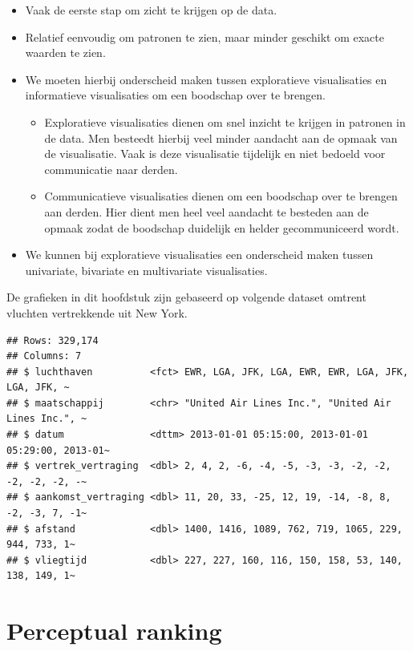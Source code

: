 \documentclass[]{tufte-book}
\providecommand{\tightlist}{%
  \setlength{\itemsep}{0pt}\setlength{\parskip}{0pt}}
\begin{document}
\begin{itemize}
\tightlist
\item
  Vaak de eerste stap om zicht te krijgen op de data.
\item
  Relatief eenvoudig om patronen te zien, maar minder geschikt om exacte waarden te zien.
\item
  We moeten hierbij onderscheid maken tussen exploratieve visualisaties en informatieve visualisaties om een boodschap over te brengen.

  \begin{itemize}
  \tightlist
  \item
    Exploratieve visualisaties dienen om snel inzicht te krijgen in patronen in de data. Men besteedt hierbij veel minder aandacht aan de opmaak van de visualisatie. Vaak is deze visualisatie tijdelijk en niet bedoeld voor communicatie naar derden.
  \item
    Communicatieve visualisaties dienen om een boodschap over te brengen aan derden. Hier dient men heel veel aandacht te besteden aan de opmaak zodat de boodschap duidelijk en helder gecommuniceerd wordt.
  \end{itemize}
\item
  We kunnen bij exploratieve visualisaties een onderscheid maken tussen univariate, bivariate en multivariate visualisaties.
\end{itemize}

De grafieken in dit hoofdstuk zijn gebaseerd op volgende dataset omtrent vluchten vertrekkende uit New York.

\begin{verbatim}
## Rows: 329,174
## Columns: 7
## $ luchthaven          <fct> EWR, LGA, JFK, LGA, EWR, EWR, LGA, JFK, LGA, JFK, ~
## $ maatschappij        <chr> "United Air Lines Inc.", "United Air Lines Inc.", ~
## $ datum               <dttm> 2013-01-01 05:15:00, 2013-01-01 05:29:00, 2013-01~
## $ vertrek_vertraging  <dbl> 2, 4, 2, -6, -4, -5, -3, -3, -2, -2, -2, -2, -2, -~
## $ aankomst_vertraging <dbl> 11, 20, 33, -25, 12, 19, -14, -8, 8, -2, -3, 7, -1~
## $ afstand             <dbl> 1400, 1416, 1089, 762, 719, 1065, 229, 944, 733, 1~
## $ vliegtijd           <dbl> 227, 227, 160, 116, 150, 158, 53, 140, 138, 149, 1~
\end{verbatim}

\hypertarget{perceptual-ranking}{%
\section{Perceptual ranking}\label{perceptual-ranking}}
\end{document}

